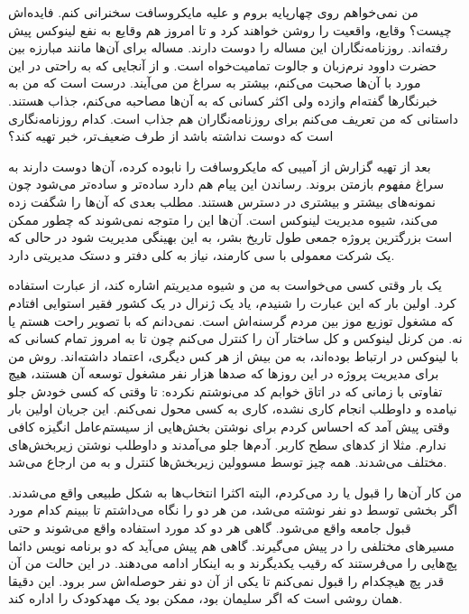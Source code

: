 من نمی‌خواهم روی چهارپایه بروم و علیه مایکروسافت سخنرانی کنم. فایده‌اش
چیست؟‌ وقایع، واقعیت را روشن خواهند کرد و تا امروز هم وقایع به نفع
لینوکس پیش رفته‌اند. روزنامه‌نگاران این مساله را دوست دارند. مساله برای
آن‌ها مانند مبارزه بین حضرت داوود نرم‌زبان و جالوت
تمامیت‌خواه است. و از آنجایی که به راحتی در
این مورد با آن‌ها صحبت می‌کنم، بیشتر به سراغ من می‌آیند. درست است که من
به خبرنگارها گفته‌ام وازده ولی اکثر کسانی که به آن‌ها مصاحبه می‌کنم، جذاب
هستند. داستانی که من تعریف می‌کنم برای روزنامه‌نگاران هم جذاب است. کدام
روزنامه‌نگاری است که دوست نداشته باشد از طرف ضعیف‌تر، خبر تهیه کند؟

بعد از تهیه گزارش از آمیبی که مایکروسافت را نابوده کرده، آن‌ها دوست
دارند به سراغ مفهوم بازمتن بروند. رساندن این پیام هم دارد ساده‌تر و
ساده‌تر می‌شود چون نمونه‌های بیشتر و بیشتری در دسترس هستند. مطلب بعدی که
آن‌ها را شگفت زده می‌کند، شیوه مدیریت لینوکس است. آن‌ها این را متوجه
نمی‌شوند که چطور ممکن است بزرگترین پروژه جمعی طول تاریخ بشر، به این
بهینگی مدیریت شود در حالی که یک شرکت معمولی با سی کارمند، نیاز به کلی
دفتر و دستک مدیریتی دارد.

 یک بار وقتی کسی می‌خواست به من و شیوه مدیریتم اشاره کند، از عبارت
  استفاده کرد. اولین بار که این عبارت را
 شنیدم، یاد یک ژنرال در یک کشور فقیر استوایی افتادم که مشغول توزیع موز
 بین مردم گرسنه‌اش است. نمی‌دانم که با تصویر  راحت
 هستم یا نه. من کرنل لینوکس و کل ساختار آن را کنترل می‌کنم چون تا به
 امروز تمام کسانی که با لینوکس در ارتباط بوده‌اند، به من بیش از هر کس
 دیگری، اعتماد داشته‌اند. روش من برای مدیریت پروژه در این روزها که صدها
 هزار نفر مشغول توسعه آن‌ هستند، هیچ تفاوتی با زمانی که در اتاق خوابم
 کد می‌نوشتم نکرده: تا وقتی که کسی خودش جلو نیامده و داوطلب انجام کاری
 نشده، کاری به کسی محول نمی‌کنم. این جریان اولین بار وقتی پیش آمد که
 احساس کردم برای نوشتن بخش‌هایی از سیستم‌عامل انگیزه کافی ندارم. مثلا از
 کدهای سطح کاربر. آدم‌ها جلو می‌آمدند و داوطلب نوشتن زیربخش‌های مختلف
 می‌شدند. همه چیز توسط مسوولین زیربخش‌ها کنترل و به من ارجاع می‌شد.

من کار آن‌ها را قبول یا رد می‌کردم، البته اکثرا انتخاب‌ها به شکل طبیعی
واقع می‌شدند. اگر بخشی توسط دو نفر نوشته می‌شد، من هر دو را نگاه می‌داشتم
تا ببینم کدام مورد قبول جامعه واقع می‌شود. گاهی هر دو کد مورد استفاده
واقع می‌شوند و حتی مسیرهای مختلفی را در پیش می‌گیرند. گاهی هم پیش می‌آید
که دو برنامه نویس دائما پچ‌هایی را می‌فرستند که رقیب یکدیگرند و به
اینکار ادامه می‌دهند. در این حالت من آن قدر پچ هیچکدام را قبول نمی‌کنم
تا یکی از آن دو نفر حوصله‌اش سر برود. این دقیقا همان روشی است که اگر
سلیمان بود، ممکن بود یک مهدکودک را اداره کند.


